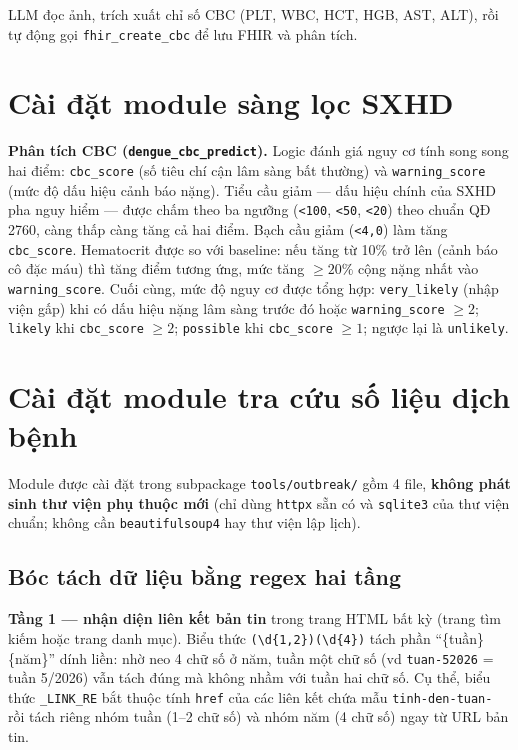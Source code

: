 \documentclass[a4paper,13pt,3p,oneside]{report}
\theoremstyle{definition}
\theoremstyle{remark}
\theoremstyle{definition}
\begin{document}
LLM đọc ảnh, trích xuất chỉ số CBC (PLT, WBC, HCT, HGB, AST, ALT), rồi tự động gọi \texttt{fhir\_create\_cbc} để lưu FHIR và phân tích.

\section{Cài đặt module sàng lọc SXHD}

\textbf{Phân tích CBC (\texttt{dengue\_cbc\_predict}).} Logic đánh giá nguy cơ tính song song hai điểm: \texttt{cbc\_score} (số tiêu chí cận lâm sàng bất thường) và \texttt{warning\_score} (mức độ dấu hiệu cảnh báo nặng). Tiểu cầu giảm --- dấu hiệu chính của SXHD pha nguy hiểm --- được chấm theo ba ngưỡng (\texttt{<100}, \texttt{<50}, \texttt{<20}) theo chuẩn QĐ 2760, càng thấp càng tăng cả hai điểm. Bạch cầu giảm (\texttt{<4{,}0}) làm tăng \texttt{cbc\_score}. Hematocrit được so với baseline: nếu tăng từ 10\% trở lên (cảnh báo cô đặc máu) thì tăng điểm tương ứng, mức tăng $\geq 20\%$ cộng nặng nhất vào \texttt{warning\_score}. Cuối cùng, mức độ nguy cơ được tổng hợp: \texttt{very\_likely} (nhập viện gấp) khi có dấu hiệu nặng lâm sàng trước đó hoặc \texttt{warning\_score} $\geq 2$; \texttt{likely} khi \texttt{cbc\_score} $\geq 2$; \texttt{possible} khi \texttt{cbc\_score} $\geq 1$; ngược lại là \texttt{unlikely}.

\section{Cài đặt module tra cứu số liệu dịch bệnh}

Module được cài đặt trong subpackage \texttt{tools/outbreak/} gồm 4 file, \textbf{không phát sinh thư viện phụ thuộc mới} (chỉ dùng \texttt{httpx} sẵn có và \texttt{sqlite3} của thư viện chuẩn; không cần \texttt{beautifulsoup4} hay thư viện lập lịch).

\subsection{Bóc tách dữ liệu bằng regex hai tầng}

\textbf{Tầng 1 --- nhận diện liên kết bản tin} trong trang HTML bất kỳ (trang tìm kiếm hoặc trang danh mục). Biểu thức \texttt{(\textbackslash d\{1,2\})(\textbackslash d\{4\})} tách phần ``\{tuần\}\{năm\}'' dính liền: nhờ neo 4 chữ số ở năm, tuần một chữ số (vd \texttt{tuan-52026} = tuần 5/2026) vẫn tách đúng mà không nhầm với tuần hai chữ số. Cụ thể, biểu thức \texttt{\_LINK\_RE} bắt thuộc tính \texttt{href} của các liên kết chứa mẫu \texttt{tinh-den-tuan-} rồi tách riêng nhóm tuần (1--2 chữ số) và nhóm năm (4 chữ số) ngay từ URL bản tin.
\end{document}
